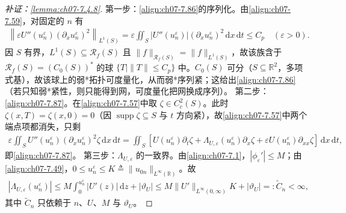 ﻿\documentclass[../../main.tex]{subfiles}%
\begin{document}
\begin{proof}[补证：\cref{lemma:ch07-7.4.8}]
第一步：\eqref{align:ch07-7.86}的序列化。由\eqref{align:ch07-7.59}，对固定的 $n$ 有
\begin{align*}
\left\|\varepsilon U''(u_n^\varepsilon)(\partial_xu_n^\varepsilon)^2\right\|_{L^1(S)}
=\varepsilon\iint_S|U''(u_n^\varepsilon)|(\partial_xu_n^\varepsilon)^2\,\mathrm{d}x\,\mathrm{d}t\leqslant C_p\quad(\varepsilon>0).
\end{align*}
因 $S$ 有界，$L^1(S)\subseteq\mathscr{R}_f(S)$ 且 $\|f\|_{\mathscr{R}_f(S)}=\|f\|_{L^1(S)}$，故该族含于 $\mathscr{R}_f(S)=(C_0(S))^*$ 的球 $\{T\mid\|T\|\leqslant C_p\}$ 中。$C_0(S)$ 可分（$S\subseteq\mathbb{R}^2$，多项式基），故该球上的弱*拓扑可度量化，从而弱*序列紧；这给出\eqref{align:ch07-7.86}（若只知弱*紧性，则只能得到网，可度量化把网换成序列）。
第二步：\eqref{align:ch07-7.87}。在\eqref{align:ch07-7.57}中取 $\zeta\in C^2_c(S)$。此时 $\zeta(x,T)=\zeta(x,0)=0$（因 $\operatorname{supp}\zeta\subseteq S$ 与 $t$ 方向紧），故\eqref{align:ch07-7.57}中两个端点项都消失，只剩
\begin{align*}
\varepsilon\iint_SU''(u_n^\varepsilon)(\partial_xu_n^\varepsilon)^2\zeta\,\mathrm{d}x\,\mathrm{d}t
=\iint_S[U(u_n^\varepsilon)\partial_t\zeta+\Lambda_{U,\varepsilon}(u_n^\varepsilon)\partial_x\zeta+\varepsilon U(u_n^\varepsilon)\partial_{xx}\zeta]\,\mathrm{d}x\,\mathrm{d}t,
\end{align*}
即\eqref{align:ch07-7.87}。
第三步：$\Lambda_{U,\varepsilon}$ 的一致界。由\eqref{align:ch07-7.1}，$|\phi_\varepsilon'|\leqslant M$；由\eqref{align:ch07-7.49}，$0\leqslant u_n^\varepsilon\leqslant K\triangleq\|u_{0n}\|_{L^\infty(\mathbb{R})}$。故
\begin{align*}
|\Lambda_{U,\varepsilon}(u_n^\varepsilon)|\leqslant M\int_0^{u_n^\varepsilon}|U'(z)|\,\mathrm{d}z+|\vartheta_U|
\leqslant M\|U'\|_{L^\infty(0,\infty)}K+|\vartheta_U|=:\widetilde C_n<\infty,
\end{align*}
其中 $\widetilde C_n$ 只依赖于 $n$、$U$、$M$ 与 $\vartheta_U$。

\end{proof}
\end{document}

